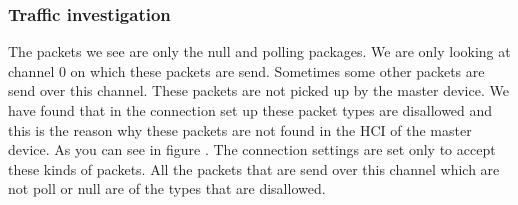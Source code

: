 \subsubsection{Traffic investigation}
The packets we see are only  the null and polling packages. We are only looking at channel 0  on which these packets are send. Sometimes some other packets are send over this channel. These packets are not picked up by the master device. We have found that in the connection set up these packet types are disallowed and this is the reason why these packets are not found in the HCI of the master device. As you can see in figure . The connection settings are set only to accept these kinds of packets. All the packets that are send over this channel which are not poll or null are of the types that are disallowed.  